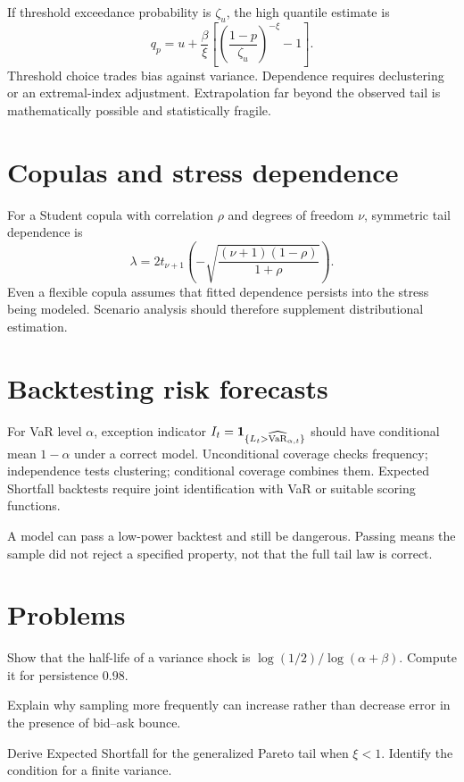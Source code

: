 If threshold exceedance probability is $\zeta_u$, the high quantile estimate is
\[
q_p=u+\frac{\beta}{\xi}
\left[\left(\frac{1-p}{\zeta_u}\right)^{-\xi}-1\right].
\]
Threshold choice trades bias against variance. Dependence requires declustering or
an extremal-index adjustment. Extrapolation far beyond the observed tail is
mathematically possible and statistically fragile.

\section{Copulas and stress dependence}

For a Student copula with correlation $\rho$ and degrees of freedom $\nu$, symmetric
tail dependence is
\[
\lambda=2t_{\nu+1}\left(
-\sqrt{\frac{(\nu+1)(1-\rho)}{1+\rho}}
\right).
\]
Even a flexible copula assumes that fitted dependence persists into the stress being
modeled. Scenario analysis should therefore supplement distributional estimation.

\section{Backtesting risk forecasts}

For VaR level $\alpha$, exception indicator
$I_t=\mathbf 1_{\{L_t>\widehat{\operatorname{VaR}}_{\alpha,t}\}}$ should have conditional mean
$1-\alpha$ under a correct model. Unconditional coverage checks frequency;
independence tests clustering; conditional coverage combines them. Expected
Shortfall backtests require joint identification with VaR or suitable scoring
functions.

\begin{warning}
A model can pass a low-power backtest and still be dangerous. Passing means the
sample did not reject a specified property, not that the full tail law is correct.
\end{warning}

\section{Problems}

\begin{exercise}
Show that the half-life of a variance shock is
$\log(1/2)/\log(\alpha+\beta)$. Compute it for persistence $0.98$.
\end{exercise}
\begin{exercise}
Explain why sampling more frequently can increase rather than decrease error in the
presence of bid--ask bounce.
\end{exercise}
\begin{exercise}
Derive Expected Shortfall for the generalized Pareto tail when $\xi<1$. Identify the
condition for a finite variance.
\end{exercise}


